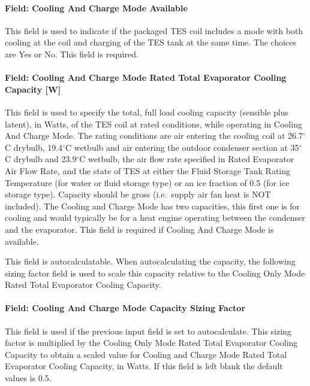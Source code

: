 \paragraph{Field: Cooling And Charge Mode Available}\label{field-cooling-and-charge-mode-available}

This field is used to indicate if the packaged TES coil includes a mode with both cooling at the coil and charging of the TES tank at the same time. The choices are Yes or No. This field is required.

\paragraph{Field: Cooling And Charge Mode Rated Total Evaporator Cooling Capacity {[}W{]}}\label{field-cooling-and-charge-mode-rated-total-evaporator-cooling-capacity-w}

This field is used to specify the total, full load cooling capacity (sensible plus latent), in Watts, of the TES coil at rated conditions, while operating in Cooling And Charge Mode. The rating conditions are air entering the cooling coil at 26.7$^\circ$C drybulb, 19.4$^\circ$C wetbulb and air entering the outdoor condenser section at 35$^\circ$C drybulb and 23.9$^\circ$C wetbulb, the air flow rate specified in Rated Evaporator Air Flow Rate, and the state of TES at either the Fluid Storage Tank Rating Temperature (for water or fluid storage type) or an ice fraction of 0.5 (for ice storage type). Capacity should be gross (i.e.~supply air fan heat is NOT included). The Cooling and Charge Mode has two capacities, this first one is for cooling and would typically be for a heat engine operating between the condenser and the evaporator. This field is required if Cooling And Charge Mode is available.

This field is autocalculatable. When autocalculating the capacity, the following sizing factor field is used to scale this capacity relative to the Cooling Only Mode Rated Total Evaporator Cooling Capacity.

\paragraph{Field: Cooling And Charge Mode Capacity Sizing Factor}\label{field-cooling-and-charge-mode-capacity-sizing-factor}

This field is used if the previous input field is set to autocalculate. This sizing factor is multiplied by the Cooling Only Mode Rated Total Evaporator Cooling Capacity to obtain a scaled value for Cooling and Charge Mode Rated Total Evaporator Cooling Capacity, in Watts. If this field is left blank the default values is 0.5.

